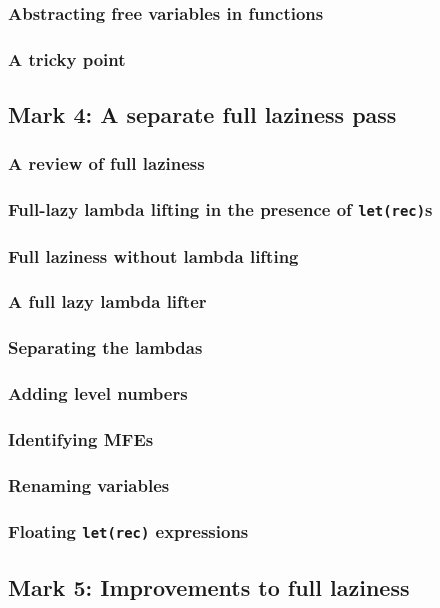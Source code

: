 \documentclass{jarticle}
\begin{document}
\subsubsection{Abstracting free variables in functions}
\subsubsection{A tricky point \dag}
\newpage

\subsection{Mark 4: A separate full laziness pass}
\subsubsection{A review of full laziness}
\subsubsection{Full-lazy lambda lifting in the presence of \texttt{let(rec)}s}
\subsubsection{Full laziness without lambda lifting}
\subsubsection{A full lazy lambda lifter}
\subsubsection{Separating the lambdas}
\subsubsection{Adding level numbers}
\subsubsection{Identifying MFEs}
\subsubsection{Renaming variables}
\subsubsection{Floating \texttt{let(rec)} expressions}
\newpage

\subsection{Mark 5: Improvements to full laziness}
\end{document}

